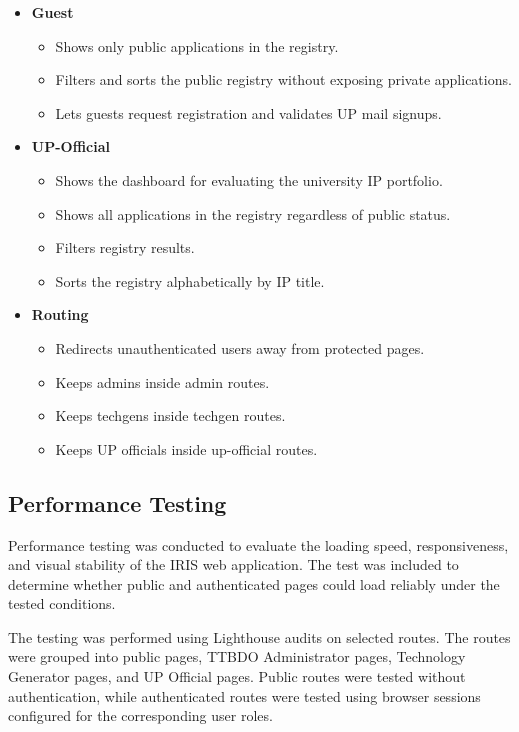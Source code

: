 \begin{itemize}
    \item \textbf{Guest}
    \begin{itemize}
        \item Shows only public applications in the registry.
        \item Filters and sorts the public registry without exposing private applications.
        \item Lets guests request registration and validates UP mail signups.
    \end{itemize}

    \item \textbf{UP-Official}
    \begin{itemize}
        \item Shows the dashboard for evaluating the university IP portfolio.
        \item Shows all applications in the registry regardless of public status.
        \item Filters registry results.
        \item Sorts the registry alphabetically by IP title.
    \end{itemize}

    \item \textbf{Routing}
    \begin{itemize}
        \item Redirects unauthenticated users away from protected pages.
        \item Keeps admins inside admin routes.
        \item Keeps techgens inside techgen routes.
        \item Keeps UP officials inside up-official routes.
    \end{itemize}
\end{itemize}

\FloatBarrier

\subsection{Performance Testing}

Performance testing was conducted to evaluate the loading speed, responsiveness, and visual stability of the IRIS web application. The test was included to determine whether public and authenticated pages could load reliably under the tested conditions.

The testing was performed using Lighthouse audits on selected routes. The routes were grouped into public pages, TTBDO Administrator pages, Technology Generator pages, and UP Official pages. Public routes were tested without authentication, while authenticated routes were tested using browser sessions configured for the corresponding user roles.

